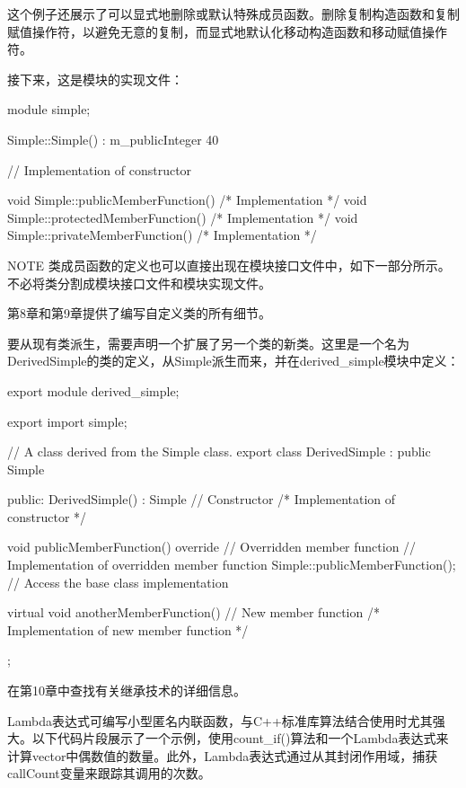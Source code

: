 这个例子还展示了可以显式地删除或默认特殊成员函数。删除复制构造函数和复制赋值操作符，以避免无意的复制，而显式地默认化移动构造函数和移动赋值操作符。

接下来，这是模块的实现文件：

\begin{cpp}
module simple;

Simple::Simple() : m_publicInteger { 40 }

{
    // Implementation of constructor
}

void Simple::publicMemberFunction() { /* Implementation */ }
void Simple::protectedMemberFunction() { /* Implementation */ }
void Simple::privateMemberFunction() { /* Implementation */ }
\end{cpp}

\begin{myNotic}{NOTE}
类成员函数的定义也可以直接出现在模块接口文件中，如下一部分所示。不必将类分割成模块接口文件和模块实现文件。
\end{myNotic}

第8章和第9章提供了编写自定义类的所有细节。


要从现有类派生，需要声明一个扩展了另一个类的新类。这里是一个名为DerivedSimple的类的定义，从Simple派生而来，并在derived\_simple模块中定义：

\begin{cpp}
export module derived_simple;

export import simple;

// A class derived from the Simple class.
export class DerivedSimple : public Simple
{
    public:
        DerivedSimple() : Simple{} // Constructor
        { /* Implementation of constructor */ }

        void publicMemberFunction() override // Overridden member function
        {
            // Implementation of overridden member function
            Simple::publicMemberFunction(); // Access the base class implementation
        }

        virtual void anotherMemberFunction() // New member function
        { /* Implementation of new member function */ }
};
\end{cpp}

在第10章中查找有关继承技术的详细信息。


Lambda表达式可编写小型匿名内联函数，与C++标准库算法结合使用时尤其强大。以下代码片段展示了一个示例，使用count\_if()算法和一个Lambda表达式来计算vector中偶数值的数量。此外，Lambda表达式通过从其封闭作用域，捕获callCount变量来跟踪其调用的次数。

